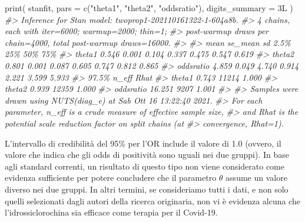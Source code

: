 \documentclass[
  11pt,
  italian,
  a4paper,
  extrafontsizes,onecolumn,openright
  ]{memoir}
\newenvironment{Shaded}{\begin{snugshade}}{\end{snugshade}}
\newcommand{\AttributeTok}[1]{\textcolor[rgb]{0.77,0.63,0.00}{#1}}
\newcommand{\CommentTok}[1]{\textcolor[rgb]{0.56,0.35,0.01}{\textit{#1}}}
\newcommand{\FunctionTok}[1]{\textcolor[rgb]{0.00,0.00,0.00}{#1}}
\newcommand{\NormalTok}[1]{#1}
\newcommand{\OtherTok}[1]{\textcolor[rgb]{0.56,0.35,0.01}{#1}}
\newcommand{\SpecialCharTok}[1]{\textcolor[rgb]{0.00,0.00,0.00}{#1}}
\newcommand{\StringTok}[1]{\textcolor[rgb]{0.31,0.60,0.02}{#1}}
\begin{document}
\begin{Shaded}
\end{Shaded}

\begin{Shaded}
\begin{Highlighting}[]
\FunctionTok{print}\NormalTok{(}
\NormalTok{  stanfit,}
  \AttributeTok{pars =} \FunctionTok{c}\NormalTok{(}\StringTok{"theta1"}\NormalTok{, }\StringTok{"theta2"}\NormalTok{, }\StringTok{"oddsratio"}\NormalTok{),}
  \AttributeTok{digits\_summary =}\NormalTok{ 3L}
\NormalTok{)}
\CommentTok{\#\textgreater{} Inference for Stan model: twoprop1{-}202110161322{-}1{-}604a8b.}
\CommentTok{\#\textgreater{} 4 chains, each with iter=6000; warmup=2000; thin=1; }
\CommentTok{\#\textgreater{} post{-}warmup draws per chain=4000, total post{-}warmup draws=16000.}
\CommentTok{\#\textgreater{} }
\CommentTok{\#\textgreater{}            mean se\_mean    sd  2.5\%   25\%   50\%   75\%}
\CommentTok{\#\textgreater{} theta1    0.546   0.001 0.104 0.337 0.475 0.547 0.619}
\CommentTok{\#\textgreater{} theta2    0.801   0.001 0.087 0.605 0.747 0.812 0.865}
\CommentTok{\#\textgreater{} oddsratio 4.859   0.049 4.740 0.914 2.221 3.599 5.933}
\CommentTok{\#\textgreater{}            97.5\% n\_eff  Rhat}
\CommentTok{\#\textgreater{} theta1     0.743 11214 1.000}
\CommentTok{\#\textgreater{} theta2     0.939 12359 1.000}
\CommentTok{\#\textgreater{} oddsratio 16.251  9207 1.001}
\CommentTok{\#\textgreater{} }
\CommentTok{\#\textgreater{} Samples were drawn using NUTS(diag\_e) at Sab Ott 16 13:22:40 2021.}
\CommentTok{\#\textgreater{} For each parameter, n\_eff is a crude measure of effective sample size,}
\CommentTok{\#\textgreater{} and Rhat is the potential scale reduction factor on split chains (at }
\CommentTok{\#\textgreater{} convergence, Rhat=1).}
\end{Highlighting}
\end{Shaded}

L'intervallo di credibilità del 95\% per l'OR include il valore di 1.0 (ovvero, il valore che indica che gli odds di positività sono uguali nei due gruppi). In base agli standard correnti, un risultato di questo tipo non viene considerato come evidenza sufficiente per potere concludere che il parametro \(\theta\) assume un valore diverso nei due gruppi. In altri termini, se consideriamo tutti i dati, e non solo quelli selezionati dagli autori della ricerca originaria, non vi è evidenza alcuna che l'idrossiclorochina sia efficace come terapia per il Covid-19.
\end{document}
